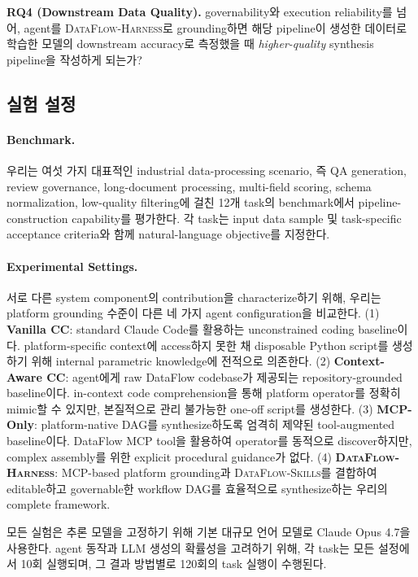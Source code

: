 \textbf{RQ4 (Downstream Data Quality).}
governability와 execution reliability를 넘어, agent를 \textsc{DataFlow-Harness}로 grounding하면 해당 pipeline이 생성한 데이터로 학습한 모델의 downstream accuracy로 측정했을 때 \emph{higher-quality} synthesis pipeline을 작성하게 되는가?

\subsection{실험 설정}

\paragraph{\textbf{Benchmark.}}
우리는 여섯 가지 대표적인 industrial data-processing scenario, 즉 QA generation, review governance, long-document processing, multi-field scoring, schema normalization, low-quality filtering에 걸친 12개 task의 benchmark에서 pipeline-construction capability를 평가한다. 각 task는 input data sample 및 task-specific acceptance criteria와 함께 natural-language objective를 지정한다. 

\paragraph{\textbf{Experimental Settings.}}

 서로 다른 system component의 contribution을 characterize하기 위해, 우리는 platform grounding 수준이 다른 네 가지 agent configuration을 비교한다. 
(1) \textbf{Vanilla CC}: standard Claude Code를 활용하는 unconstrained coding baseline이다. platform-specific context에 access하지 못한 채 disposable Python script를 생성하기 위해 internal parametric knowledge에 전적으로 의존한다. 
(2) \textbf{Context-Aware CC}: agent에게 raw DataFlow codebase가 제공되는 repository-grounded baseline이다. in-context code comprehension을 통해 platform operator를 정확히 mimic할 수 있지만, 본질적으로 관리 불가능한 one-off script를 생성한다. 
(3) \textbf{MCP-Only}: platform-native DAG를 synthesize하도록 엄격히 제약된 tool-augmented baseline이다. DataFlow MCP tool을 활용하여 operator를 동적으로 discover하지만, complex assembly를 위한 explicit procedural guidance가 없다. 
(4) \textbf{\textsc{DataFlow-Harness}}: MCP-based platform grounding과 \textsc{DataFlow-Skills}를 결합하여 editable하고 governable한 workflow DAG를 효율적으로 synthesize하는 우리의 complete framework.

모든 실험은 추론 모델을 고정하기 위해 기본 대규모 언어 모델로 Claude Opus 4.7을 사용한다. agent 동작과 LLM 생성의 확률성을 고려하기 위해, 각 task는 모든 설정에서 10회 실행되며, 그 결과 방법별로 120회의 task 실행이 수행된다.

